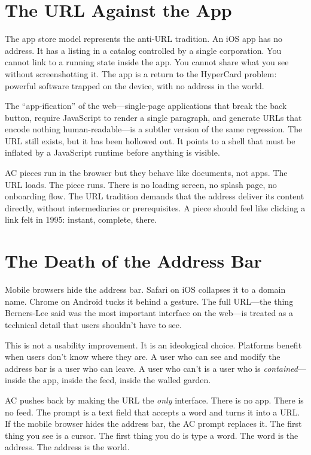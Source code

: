 \documentclass[10pt,letterpaper,twocolumn]{article}
\begin{document}
\section{The URL Against the App}

The app store model represents the anti-URL tradition. An iOS app has no address. It has a listing in a catalog controlled by a single corporation. You cannot link to a running state inside the app. You cannot share what you see without screenshotting it. The app is a return to the HyperCard problem: powerful software trapped on the device, with no address in the world.

The ``app-ification'' of the web---single-page applications that break the back button, require JavaScript to render a single paragraph, and generate URLs that encode nothing human-readable---is a subtler version of the same regression. The URL still exists, but it has been hollowed out. It points to a shell that must be inflated by a JavaScript runtime before anything is visible.

AC pieces run in the browser but they behave like documents, not apps. The URL loads. The piece runs. There is no loading screen, no splash page, no onboarding flow. The URL tradition demands that the address deliver its content directly, without intermediaries or prerequisites. A piece should feel like clicking a link felt in 1995: instant, complete, there.

\section{The Death of the Address Bar}

Mobile browsers hide the address bar. Safari on iOS collapses it to a domain name. Chrome on Android tucks it behind a gesture. The full URL---the thing Berners-Lee said was the most important interface on the web---is treated as a technical detail that users shouldn't have to see.

This is not a usability improvement. It is an ideological choice. Platforms benefit when users don't know where they are. A user who can see and modify the address bar is a user who can leave. A user who can't is a user who is \emph{contained}---inside the app, inside the feed, inside the walled garden.

AC pushes back by making the URL the \emph{only} interface. There is no app. There is no feed. The prompt is a text field that accepts a word and turns it into a URL. If the mobile browser hides the address bar, the AC prompt replaces it. The first thing you see is a cursor. The first thing you do is type a word. The word is the address. The address is the world.
\end{document}
